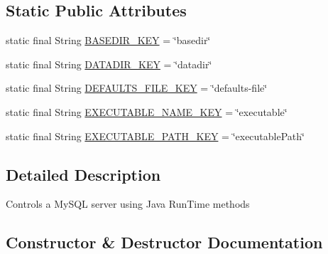 \subsection*{Static Public Attributes}
\begin{DoxyCompactItemize}
\item 
static final String \mbox{\hyperlink{classcom_1_1mysql_1_1cj_1_1admin_1_1_server_controller_a0693abdab3ee64cb24b7c8c015f92900}{B\+A\+S\+E\+D\+I\+R\+\_\+\+K\+EY}} = \char`\"{}basedir\char`\"{}
\item 
static final String \mbox{\hyperlink{classcom_1_1mysql_1_1cj_1_1admin_1_1_server_controller_a92440361cf73bb8dc8933a0416291c97}{D\+A\+T\+A\+D\+I\+R\+\_\+\+K\+EY}} = \char`\"{}datadir\char`\"{}
\item 
static final String \mbox{\hyperlink{classcom_1_1mysql_1_1cj_1_1admin_1_1_server_controller_a19adde7fe6ba494c9202852a8203903f}{D\+E\+F\+A\+U\+L\+T\+S\+\_\+\+F\+I\+L\+E\+\_\+\+K\+EY}} = \char`\"{}defaults-\/file\char`\"{}
\item 
static final String \mbox{\hyperlink{classcom_1_1mysql_1_1cj_1_1admin_1_1_server_controller_aecb230cd383088e3ae1e982950b71c02}{E\+X\+E\+C\+U\+T\+A\+B\+L\+E\+\_\+\+N\+A\+M\+E\+\_\+\+K\+EY}} = \char`\"{}executable\char`\"{}
\item 
static final String \mbox{\hyperlink{classcom_1_1mysql_1_1cj_1_1admin_1_1_server_controller_a4539d88beb132dc82a97a5003777ad7e}{E\+X\+E\+C\+U\+T\+A\+B\+L\+E\+\_\+\+P\+A\+T\+H\+\_\+\+K\+EY}} = \char`\"{}executable\+Path\char`\"{}
\end{DoxyCompactItemize}


\subsection{Detailed Description}
Controls a My\+S\+QL server using Java Run\+Time methods 

\subsection{Constructor \& Destructor Documentation}
\mbox{\label{classcom_1_1mysql_1_1cj_1_1admin_1_1_server_controller_a4bfd555ef5a52f89d6edd72232d8f4d8}} 
